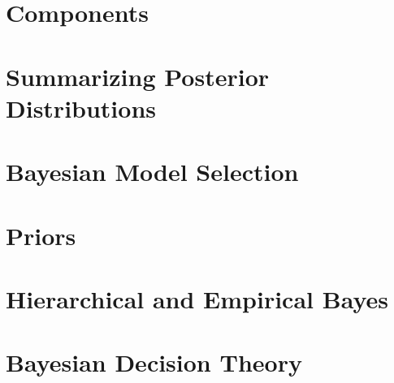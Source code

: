\section{Components}


\section{Summarizing Posterior Distributions}


\section{Bayesian Model Selection}


\section{Priors}


\section{Hierarchical and Empirical Bayes}


\section{Bayesian Decision Theory}


